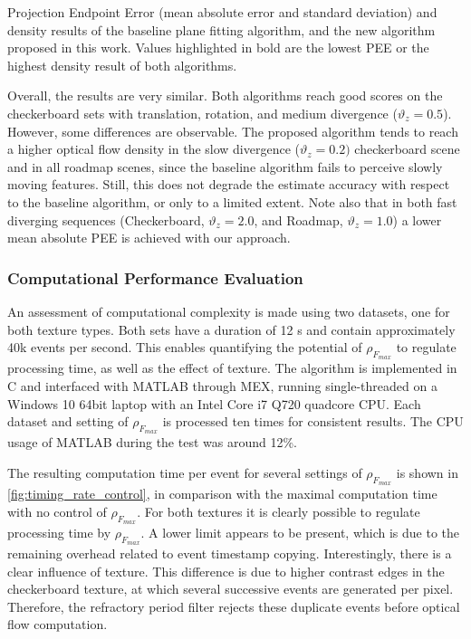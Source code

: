 \begin{table}[!ht]
	\centering
	\setlength{\tabcolsep}{0.5em}
	\renewcommand{\arraystretch}{1.3}
	\caption{Projection Endpoint Error (mean absolute error and standard deviation) and density results of the baseline plane fitting algorithm, and the new algorithm proposed in this work. Values highlighted in bold are the lowest PEE or the highest density result of both algorithms.}
	\footnotesize
	
	\label{tab:flow_errors}
\end{table} 

Overall, the results are very similar. Both algorithms reach good scores on the checkerboard sets with translation, rotation, and medium divergence ($\vartheta_z=0.5$). However, some differences are observable. The proposed algorithm tends to reach a higher optical flow density in the slow divergence ($\vartheta_z=0.2)$ checkerboard scene and in all roadmap scenes, since the baseline algorithm fails to perceive slowly moving features. Still, this does not degrade the estimate accuracy with respect to the baseline algorithm, or only to a limited extent. Note also that in both fast diverging sequences (Checkerboard, $\vartheta_z=2.0$, and Roadmap, $\vartheta_z=1.0$) a lower mean absolute PEE is achieved with our approach.

\subsubsection{Computational Performance Evaluation}
\label{sec:results_optical_flow_computation}
An assessment of computational complexity is made using two datasets, one for both texture types. Both sets have a duration of 12 s and contain approximately 40k events per second. This enables quantifying the potential of $\rho_{F_{max}}$ to regulate processing time, as well as the effect of texture. The algorithm is implemented in C and interfaced with MATLAB through MEX, running single-threaded on a Windows 10 64bit laptop with an Intel Core i7 Q720 quadcore CPU. Each dataset and setting of $\rho_{F_{max}}$ is processed ten times for consistent results. The CPU usage of MATLAB during the test was around 12\%. 

The resulting computation time per event for several settings of $\rho_{F_{max}}$ is shown in \cref{fig:timing_rate_control}, in comparison with the maximal computation time with no control of $\rho_{F_{max}}$. For both textures it is clearly possible to regulate processing time by $\rho_{F_{max}}$. A lower limit appears to be present, which is due to the remaining overhead related to event timestamp copying. Interestingly, there is a clear influence of texture. This difference is due to higher contrast edges in the checkerboard texture, at which several successive events are generated per pixel. Therefore, the refractory period filter rejects these duplicate events before optical flow computation. 

